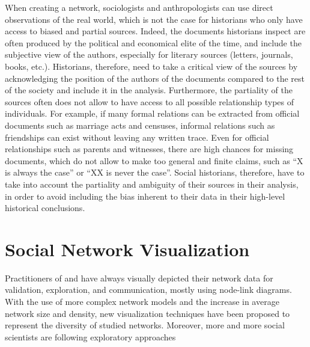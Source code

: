 When creating a network, sociologists and anthropologists can use direct observations of the real world, which is not the case for historians who only have access to biased and partial sources.
Indeed, the documents historians inspect are often produced by the political and economical elite of the time, and include the subjective view of the authors, especially for literary sources (letters, journals, books, etc.).
Historians, therefore, need to take a critical view of the sources by acknowledging the position of the authors of the documents compared to the rest of the society and include it in the analysis\cite{lemercierQuantitativeMethodsHumanities2019}.
Furthermore, the partiality of the sources often does not allow to have access to all possible relationship types of individuals.
For example, if many formal relations can be extracted from official documents such as marriage acts and censuses, informal relations such as friendships can exist without leaving any written trace\cite{lemercier12FormalNetwork2015}.
Even for official relationships such as parents and witnesses, there are high chances for missing documents, which do not allow to make too general and finite claims, such as ``X is always the case'' or ``XX is never the case''\cite{alexanderAnalysisAncientNetwork1990}.
Social historians, therefore, have to take into account the partiality and ambiguity of their sources in their analysis, in order to avoid including the bias inherent to their data in their high-level historical conclusions.


\section{Social Network Visualization}\label{sec:social-network-visualization}


Practitioners of \sna and \hsna have always visually depicted their network data for validation, exploration, and communication, mostly using node-link diagrams.
With the use of more complex network models and the increase in average network size and density, new visualization techniques have been proposed to represent the diversity of studied networks.
Moreover, more and more social scientists are following exploratory approaches 


